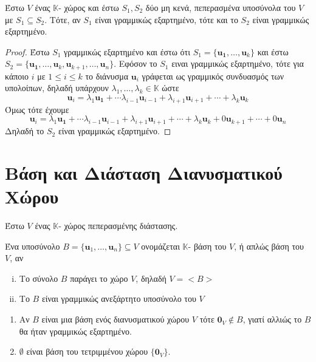 

\begin{thm}
    Έστω $V$ ένας $ \mathbb{K} $- χώρος και έστω $ S_{1}, S_{2} $ δύο μη κενά, 
    πεπερασμένα υποσύνολα του $V$ με $ S_{1} \subseteq S_{2} $. 
    Τότε, αν $ S_{1} $ είναι γραμμικώς εξαρτημένο, τότε και το $ S_{2} $ 
    είναι γραμμικώς εξαρτημένο.
\end{thm}
\begin{proof}
    Έστω $ S_{1} $ γραμμικώς εξαρτημένο και έστω ότι $ S_{1} = \{ \mathbf{u_{1}},
        \ldots, \mathbf{u}_{k} \} $ και έστω $ S_{2} = \{ \mathbf{u_{1}}, \ldots, 
    \mathbf{u}_{k}, \mathbf{u}_{k+1}, \ldots, \mathbf{u}_{n} \} $. 
    Εφόσον το $ S_{1} $ ειναι γραμμικώς εξαρτημένο, τότε για κάποιο $ i $ με 
    $ 1 \leq i \leq k $ το διάνυσμα $ \mathbf{u}_{i} $ γράφεται 
    ως γραμμικός συνδυασμός των υπολοίπων, δηλαδή υπάρχουν $ \lambda _{1}, \ldots, 
    \lambda _{k} \in \mathbb{K} $ ώστε
    \[
        \mathbf{u}_{i} = \lambda _{1} \mathbf{u_{1}}+ \cdots \lambda _{i-1} 
        \mathbf{u}_{i-1} + \lambda _{i+1} \mathbf{u}_{i+1} + \cdots + 
        \lambda _{k} \mathbf{u}_{k}
    \] 
    Όμως τότε έχουμε 
    \[
        \mathbf{u}_{i} = \lambda _{1} \mathbf{u_{1}}+ \cdots \lambda _{i-1} 
        \mathbf{u}_{i-1} + \lambda _{i+1} \mathbf{u}_{i+1} + \cdots + 
        \lambda _{k} \mathbf{u}_{k} + 0 \mathbf{u}_{k+1} + \cdots + 0 \mathbf{u}_{n}
    \] 
    Δηλαδή το $ S_{2} $ είναι γραμμικώς εξαρτημένο.
\end{proof}

\section{Βάση και Διάσταση Διανυσματικού Χώρου}

\begin{dfn}
    Έστω $ V $ ένας $ \mathbb{K} $- χώρος πεπερασμένης διάστασης.

Ένα υποσύνολο $ B = \{ \mathbf{u}_{1} , \ldots, \mathbf{u}_{n} \} \subseteq V $ 
ονομάζεται  {\color {Col2} $ \mathbb{K} $- βάση} του $V$, ή απλώς 
\textcolor{Col2}{βάση} του $V$, αν 
\begin{enumerate}[i)]
    \item Το σύνολο $B$ παράγει το χώρο $V$, δηλαδή $ V = < B >  $ 
    \item Το $B$ είναι γραμμικώς ανεξάρτητο υποσύνολο του $V$
\end{enumerate}
\end{dfn}

\begin{rems}
\item {}
    \begin{enumerate}
        \item Αν $B$ είναι μια βάση ενός διανυσματικού χώρου $V$ τότε 
            $ \mathbf{0}_{V} \not \in B $, γιατί αλλιώς το $B$ θα ήταν γραμμικώς 
            εξαρτημένο.
        \item $ \emptyset $ είναι βάση του τετριμμένου χώρου $ \{ \mathbf{0}_{V} \} $.
    \end{enumerate}
\end{rems}

